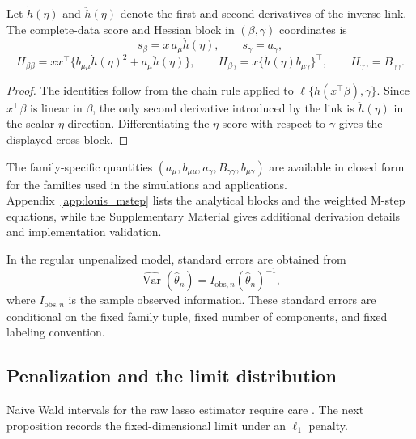 \begin{proposition}
\label{prop:louis_chain_rule}
Let \(\dot h(\eta)\) and \(\ddot h(\eta)\) denote the first and second
derivatives of the inverse link.  The complete-data score and Hessian block in
\((\beta,\gamma)\) coordinates is
\[
    s_\beta=x\,a_\mu\dot h(\eta),
    \qquad
    s_\gamma=a_\gamma,
\]
\[
    H_{\beta\beta}
    =
    xx^\top\{b_{\mu\mu}\dot h(\eta)^2+a_\mu\ddot h(\eta)\},
    \qquad
    H_{\beta\gamma}
    =
    x\{\dot h(\eta)b_{\mu\gamma}\}^\top,
    \qquad
    H_{\gamma\gamma}=B_{\gamma\gamma}.
\]
\end{proposition}

\begin{proof}
The identities follow from the chain rule applied to
\(\ell\{h(x^\top\beta),\gamma\}\).  Since \(x^\top\beta\) is linear in
\(\beta\), the only second derivative introduced by the link is
\(\ddot h(\eta)\) in the scalar \(\eta\)-direction.  Differentiating the
\(\eta\)-score with respect to \(\gamma\) gives the displayed cross block.
\end{proof}

The family-specific quantities
\((a_\mu,b_{\mu\mu},a_\gamma,B_{\gamma\gamma},b_{\mu\gamma})\) are available in
closed form for the families used in the simulations and applications.
Appendix~\ref{app:louis_mstep} lists the analytical blocks and the weighted
M-step equations, while the Supplementary Material gives additional derivation
details and implementation validation.

In the regular unpenalized model, standard errors are obtained from
\[
    \widehat{\operatorname{Var}}(\hat\theta_n)
    =
    I_{\mathrm{obs},n}(\hat\theta_n)^{-1},
\]
where \(I_{\mathrm{obs},n}\) is the sample observed information.  These standard
errors are conditional on the fixed family tuple, fixed number of components,
and fixed labeling convention.

\subsection{Penalization and the limit distribution}

Naive Wald intervals for the raw lasso estimator require care
\citep{knight2000asymptotics,leeb2005selection}.  The next proposition records
the fixed-dimensional limit under an \(\ell_1\) penalty.

